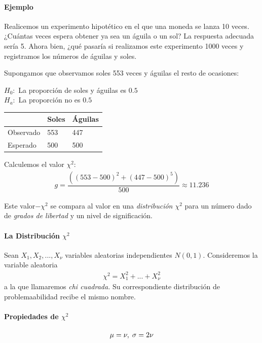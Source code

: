 \paragraph{Ejemplo}
Realicemos un experimento hipotético en el que una moneda se lanza 10 veces. ¿Cuántas veces espera obtener ya sea un águila o un sol?  La respuesta adecuada sería 5.  Ahora bien, ¿qué pasaría si realizamos este experimento 1000 veces y registramos los números de águilas y soles.


Supongamos que observamos soles 553 veces y águilas el resto de ocasiones:
\begin{center}
 $H_{0}:$ La proporción de soles y águilas es $0.5$ \\
 $H_{a}:$ La proporción no es $0.5$
\end{center}



\begin{center}
\begin{tabular}{|l|l|l|}\hline
 & Soles & Águilas\\\hline
Observado & 553 & 447\\\hline
Esperado & 500 & 500\\\hline
\end{tabular}
\end{center}


Calculemos el valor $\chi^{2}:$
\begin{align}
 g = \dfrac{\left( \left( 553-500 \right)^{2}+\left( 447-500 \right)^{5} \right)}{500}\approx 11.236
\end{align}



Este valor$-\chi^{2}$ se compara al valor en una \emph{distribución $\chi^{2}$} para un número dado de \emph{grados de libertad} y un nivel de significación.

\paragraph{La Distribución $\chi^{2}$}
Sean $X_{1},X_{2},...,X_{\nu}$ variables aleatorias independientes $N(0,1).$
 Consideremos la variable aleatoria
\begin{align}
 \label{outline:19}
 \chi^{2}=X_{1}^{2}+...+X_{\nu}^{2}
\end{align}
a la que llamaremos \emph{chi cuadrada.} Su correspondiente distribución de problemaabilidad recibe el mismo nombre.

\paragraph{Propiedades de $\chi^{2}$}
\begin{align}
 \label{eq:22}
 \mu=\nu, \; \sigma = 2\nu
\end{align}


